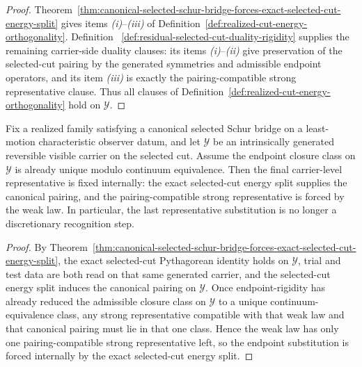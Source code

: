 \begin{proof}
Theorem~\ref{thm:canonical-selected-schur-bridge-forces-exact-selected-cut-energy-split}
gives items \emph{(i)}--\emph{(iii)} of
Definition~\ref{def:realized-cut-energy-orthogonality}. Definition~
\ref{def:residual-selected-cut-duality-rigidity} supplies the remaining
carrier-side duality clauses: its items \emph{(i)}--\emph{(ii)} give
preservation of the selected-cut pairing by the generated symmetries and
admissible endpoint operators, and its item \emph{(iii)} is exactly the
pairing-compatible strong representative clause. Thus all clauses of
Definition~\ref{def:realized-cut-energy-orthogonality} hold on
\(\mathcal Y\).
\end{proof}

\begin{theorem}
\label{thm:energy-orthogonal-cut-forces-canonical-duality}
Fix a realized family satisfying a canonical selected Schur bridge on a
least-motion characteristic observer datum, and let \(\mathcal Y\) be an
intrinsically generated reversible visible carrier on the selected cut. Assume
the endpoint closure class on \(\mathcal Y\) is already unique modulo
continuum equivalence. Then the final carrier-level representative is fixed
internally: the exact selected-cut energy split supplies the canonical
pairing, and the pairing-compatible strong representative is forced by the
weak law. In particular, the last representative substitution is no longer a
discretionary recognition step.
\end{theorem}

\begin{proof}
By
Theorem~\ref{thm:canonical-selected-schur-bridge-forces-exact-selected-cut-energy-split},
the exact selected-cut Pythagorean identity holds on \(\mathcal Y\), trial and
test data are both read on that same generated carrier, and the selected-cut
energy split induces the canonical pairing on \(\mathcal Y\). Once
endpoint-rigidity has already reduced the admissible closure class on
\(\mathcal Y\) to a unique continuum-equivalence class, any strong
representative compatible with that weak law and that canonical pairing must
lie in that one class. Hence the weak law has only one pairing-compatible
strong representative left, so the endpoint substitution is forced internally
by the exact selected-cut energy split.
\end{proof}

